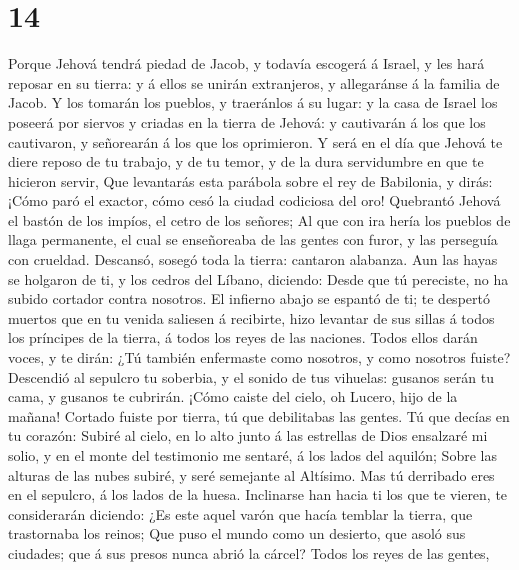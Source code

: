 \hypertarget{section-13}{%
\section{14}\label{section-13}}

 Porque Jehová tendrá piedad de Jacob, y todavía escogerá
á Israel, y les hará reposar en su tierra: y á ellos se unirán
extranjeros, y allegaránse á la familia de Jacob.  Y los
tomarán los pueblos, y traeránlos á su lugar: y la casa de Israel los
poseerá por siervos y criadas en la tierra de Jehová: y cautivarán á los
que los cautivaron, y señorearán á los que los oprimieron.
 Y será en el día que Jehová te diere reposo de tu
trabajo, y de tu temor, y de la dura servidumbre en que te hicieron
servir,  Que levantarás esta parábola sobre el rey de
Babilonia, y dirás: ¡Cómo paró el exactor, cómo cesó la ciudad codiciosa
del oro!  Quebrantó Jehová el bastón de los impíos, el
cetro de los señores;  Al que con ira hería los pueblos de
llaga permanente, el cual se enseñoreaba de las gentes con furor, y las
perseguía con crueldad.  Descansó, sosegó toda la tierra:
cantaron alabanza.  Aun las hayas se holgaron de ti, y los
cedros del Líbano, diciendo: Desde que tú pereciste, no ha subido
cortador contra nosotros.  El infierno abajo se espantó de
ti; te despertó muertos que en tu venida saliesen á recibirte, hizo
levantar de sus sillas á todos los príncipes de la tierra, á todos los
reyes de las naciones.  Todos ellos darán voces, y te
dirán: ¿Tú también enfermaste como nosotros, y como nosotros fuiste?
 Descendió al sepulcro tu soberbia, y el sonido de tus
vihuelas: gusanos serán tu cama, y gusanos te cubrirán. 
¡Cómo caiste del cielo, oh Lucero, hijo de la mañana! Cortado fuiste por
tierra, tú que debilitabas las gentes.  Tú que decías en
tu corazón: Subiré al cielo, en lo alto junto á las estrellas de Dios
ensalzaré mi solio, y en el monte del testimonio me sentaré, á los lados
del aquilón;  Sobre las alturas de las nubes subiré, y
seré semejante al Altísimo.  Mas tú derribado eres en el
sepulcro, á los lados de la huesa.  Inclinarse han hacia
ti los que te vieren, te considerarán diciendo: ¿Es este aquel varón que
hacía temblar la tierra, que trastornaba los reinos;  Que
puso el mundo como un desierto, que asoló sus ciudades; que á sus presos
nunca abrió la cárcel?  Todos los reyes de las gentes,
